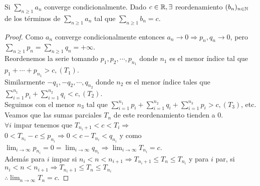 \begin{theorem}
  Si $\sum_{n \geq 1} a_n$ converge condicionalmente. Dado $c \in \mathbb{R}, \exists$ reordenamiento $(b_n)_{n \in \mathbb{N}}$ de los términos de $\sum_{n \geq 1} a_n$ tal que $\sum_{n \geq 1} b_n = c$.
  \begin{proof}
    Como $a_n$ converge condicionalmente entonces $a_n \to 0 \Rightarrow p_n, q_n \to 0$, pero $\sum_{n \geq 1} p_n = \sum_{n \geq 1} q_n = +\infty$. \\
    Reordenemos la serie tomando $p_1, p_2, \cdots, p_{n_1}$ donde $n_1$ es el menor índice tal que $p_1 + \cdots + p_{n_1} > c, (T_1)$. \\
    Similarmente $-q_1, -q_2, \cdots, q_{n_2}$ donde $n_2$ es el menor índice tales que $\sum_{i = 1}^{n_1} p_i + \sum_{i = 1}^{n_2} q_i < c, (T_2)$. \\
    Seguimos con el menor $n_3$ tal que $\sum_{i = 1}^{n_1} p_i + \sum_{i = 1}^{n_2} q_i + \sum_{i = 1}^{n_3} p_i > c, (T_3)$, etc. \\
    Veamos que las sumas parciales $T_n$ de este reordenamiento tienden a 0. \\
    $\forall i$ impar tenemos que $T_{n_i +1} < c < T_i \Rightarrow$ \\
    $0 < T_{n_i} - c \leq p_{n_i} \Rightarrow 0 < c - T_{n_i} < q_{n_i}$ y como $\lim_{i \to \infty} p_{n_i} = 0 = \lim_{i \to \infty} q_{n_i} \Rightarrow \lim_{i \to \infty} T_{n_i} = c$. \\
    Además para $i$ impar si $n_i < n < n_{i+1} \Rightarrow T_{n_i+1} \leq T_n \leq T_{n_i}$ y para $i$ par, si $n_i < n < n_{i+1} \Rightarrow T_{n_i+1} \leq T_n \leq T_{n_i}$ \\
    $\therefore \lim_{n \to \infty} T_n = c$.
  \end{proof}
\end{theorem}
